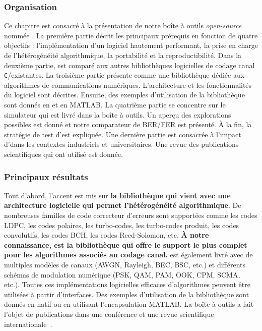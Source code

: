 \subsubsection*{Organisation}

Ce chapitre est consacré à la présentation de notre boîte à outils
\emph{open-source} nommée \AFFECT. La première partie décrit les principaux
prérequis en fonction de quatre objectifs : l'implémentation d'un logiciel
hautement performant, la prise en charge de l'hétérogénéité algorithmique, la
portabilité et la reproductibilité. Dans la deuxième partie, \AFFECT est comparé
aux autres bibliothèques logicielles de codage canal \verb|C|/\Cxx existantes.
La troisième partie présente \AFFECT comme une bibliothèque dédiée aux
algorithmes de communications numériques. L'architecture et les fonctionnalités
du logiciel sont décrites. Ensuite, des exemples d'utilisation de la
bibliothèque sont donnés en \Cxx et en MATLAB\R. La quatrième partie se
concentre sur le simulateur \AFFECT qui est livré dans la boîte à outils. Un
aperçu des explorations possibles est donné et notre comparateur de BER/FER est
présenté. À la fin, la stratégie de test d'\AFFECT est expliquée. Une dernière
partie est consacrée à l'impact d'\AFFECT dans les contextes industriels et
universitaires. Une revue des publications scientifiques qui ont utilisé \AFFECT
est donnée.

\subsubsection*{Principaux résultats}

Tout d'abord, l'accent est mis sur \textbf{la bibliothèque \AFFECT qui vient
avec une architecture logicielle qui permet l'hétérogénéité algorithmique}. De
nombreuses familles de code correcteur d'erreurs sont supportées comme les
codes LDPC, les codes polaires, les turbo-codes, les turbo-codes produit, les
codes convolutifs, les codes BCH, les codes Reed-Solomon, etc. \textbf{À notre
connaissance, \AFFECT est la bibliothèque qui offre le support le plus complet
pour les algorithmes associés au codage canal.} \AFFECT est également livré avec
de multiples modèles de canaux  (AWGN, Rayleigh, BEC, BSC, etc.) et différents
schémas de modulation numérique (PSK, QAM, PAM, OOK, CPM, SCMA, etc.). Toutes
ces implémentations logicielles efficaces d'algorithmes peuvent être utilisées à
partir d'interfaces. Des exemples d'utilisation de la bibliothèque sont donnés
en \Cxx natif ou en utilisant l'encapsulation MATLAB\R. La boîte à outils
\AFFECT a fait l'objet de publications dans une conférence et une revue
scientifique internationale~\cite{Cassagne2017a,Cassagne2019a}.

